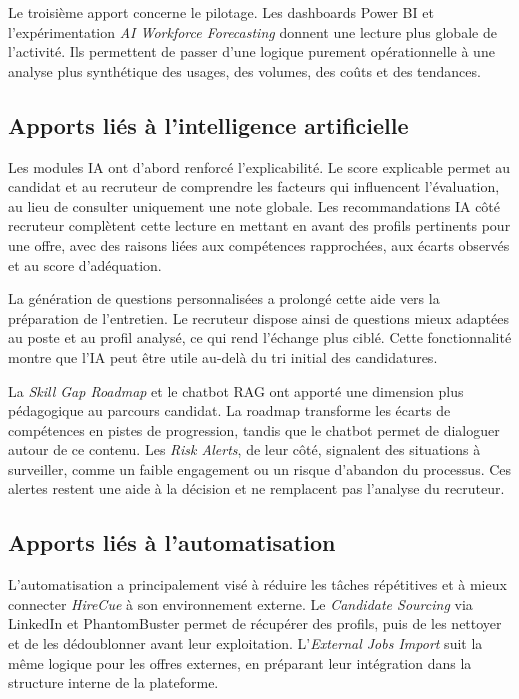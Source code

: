 Le troisième apport concerne le pilotage. Les dashboards Power BI et l'expérimentation \textit{AI Workforce Forecasting} donnent une lecture plus globale de l'activité. Ils permettent de passer d'une logique purement opérationnelle à une analyse plus synthétique des usages, des volumes, des coûts et des tendances.

\subsection{Apports liés à l'intelligence artificielle}

Les modules IA ont d'abord renforcé l'explicabilité. Le score explicable permet au candidat et au recruteur de comprendre les facteurs qui influencent l'évaluation, au lieu de consulter uniquement une note globale. Les recommandations IA côté recruteur complètent cette lecture en mettant en avant des profils pertinents pour une offre, avec des raisons liées aux compétences rapprochées, aux écarts observés et au score d'adéquation.

La génération de questions personnalisées a prolongé cette aide vers la préparation de l'entretien. Le recruteur dispose ainsi de questions mieux adaptées au poste et au profil analysé, ce qui rend l'échange plus ciblé. Cette fonctionnalité montre que l'IA peut être utile au-delà du tri initial des candidatures.

La \textit{Skill Gap Roadmap} et le chatbot RAG ont apporté une dimension plus pédagogique au parcours candidat. La roadmap transforme les écarts de compétences en pistes de progression, tandis que le chatbot permet de dialoguer autour de ce contenu. Les \textit{Risk Alerts}, de leur côté, signalent des situations à surveiller, comme un faible engagement ou un risque d'abandon du processus. Ces alertes restent une aide à la décision et ne remplacent pas l'analyse du recruteur.

\subsection{Apports liés à l'automatisation}

L'automatisation a principalement visé à réduire les tâches répétitives et à mieux connecter \textit{HireCue} à son environnement externe. Le \textit{Candidate Sourcing} via LinkedIn et PhantomBuster permet de récupérer des profils, puis de les nettoyer et de les dédoublonner avant leur exploitation. L'\textit{External Jobs Import} suit la même logique pour les offres externes, en préparant leur intégration dans la structure interne de la plateforme.

